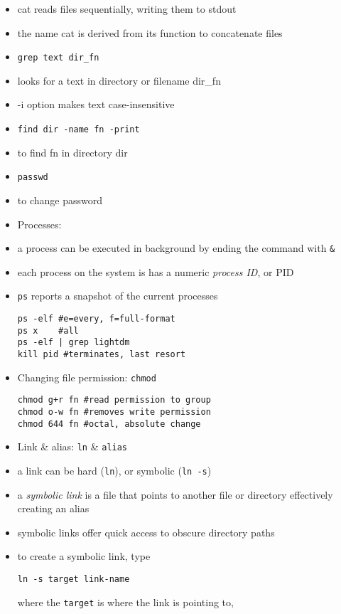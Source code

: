 \documentclass[twocolumn]{IEEEtran} %
\begin{document}
\begin{itemize}
    \bi
        \item cat reads files sequentially, writing them to stdout
        \item the name cat is derived from its function to concatenate files
    \ei
    \item \verb|grep text dir_fn|
    \bi
        \item looks for a  text in directory or filename dir\_fn
        \item -i option makes text case-insensitive
    \ei
    \item \verb|find dir -name fn -print|
    \bi
        \item to find fn in directory dir
    \ei
    \item \verb|passwd|
    \bi
        \item to change password
    \ei
    \item Processes:
    \bi
        \item a process can be executed in background by ending the command with \verb|&|
        \item each process on the system is has a numeric \emph{process ID}, or PID
        \item \verb|ps| reports a snapshot of the current processes
        \begin{verbatim}
ps -elf #e=every, f=full-format
ps x    #all
ps -elf | grep lightdm
kill pid #terminates, last resort
        \end{verbatim}
    \ei
    \item Changing file permission: \verb|chmod|
    \begin{verbatim}
chmod g+r fn #read permission to group
chmod o-w fn #removes write permission
chmod 644 fn #octal, absolute change
    \end{verbatim}
    \item Link \& alias: \verb|ln| \& \verb|alias|
    \bi
        \item a link can be hard (\verb|ln|), or symbolic (\verb|ln -s|)
        \item a \emph{symbolic link} is a file that points to another file or directory effectively creating an alias
        \item symbolic links offer quick access to obscure directory paths
        \item to create a symbolic link, type
        \begin{verbatim}
ln -s target link-name
        \end{verbatim}
        where the \verb|target| is where the link is pointing to,

\end{itemize}
\end{document}
